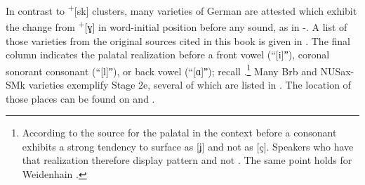 In contrast to  \textsuperscript{+}[sk] clusters, many varieties of German are attested which exhibit the change from \textsuperscript{+}[ɣ] in word-initial position before any sound, as in -. A list of those varieties from the original sources cited in this book is given in . The final column indicates the palatal realization before a front vowel (“[i]ˮ), coronal sonorant consonant (“[l]ˮ), or back vowel (“[ɑ]ˮ); recall .\footnote{According to the source for  \citep[37]{Seibicke1967} the palatal in the context before a consonant exhibits a strong tendency to surface as [ʝ] and not as [ç]. Speakers who have that realization therefore display pattern  and not . The same point holds for Weidenhain \citep[39]{Krug1969}.} Many Brb and NUSax-SMk varieties exemplify Stage 2e, several of which are listed in . The location of those places can be found on  and .

